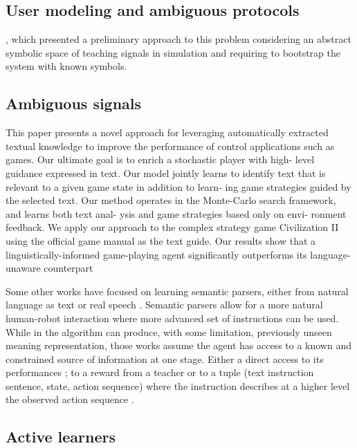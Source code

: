 \subsection{User modeling and ambiguous protocols}

\cite{macl11simul}, which presented a preliminary approach to this problem considering an abstract symbolic space of teaching signals in simulation and requiring to bootstrap the system with known symbols. 

\subsection{Ambiguous signals}

\cite{branavan2011learning} This paper presents a novel approach for leveraging automatically extracted textual knowledge to improve the performance of control applications such as games. Our ultimate goal is to enrich a stochastic player with high- level guidance expressed in text. Our model jointly learns to identify text that is relevant to a given game state in addition to learn- ing game strategies guided by the selected text. Our method operates in the Monte-Carlo search framework, and learns both text anal- ysis and game strategies based only on envi- ronment feedback. We apply our approach to the complex strategy game Civilization II using the official game manual as the text guide. Our results show that a linguistically-informed game-playing agent significantly outperforms its language-unaware counterpart

Some other works have focused on learning semantic parsers, either from natural language as text \cite{branavan2011learning,kim2012unsupervised} or real speech \cite{doshi2008spoken}. Semantic parsers allow for a more natural human-robot interaction where more advanced set of instructions can be used. While in \cite{kim2012unsupervised} the algorithm can produce, with some limitation, previously unseen meaning representation, those works assume the agent has access to a known and constrained source of information at one stage. Either a direct access to its performances \cite{branavan2011learning}; to a reward from a teacher \cite{doshi2008spoken} or to a tuple (text instruction sentence, state, action sequence) where the instruction describes at a higher level the observed action sequence \cite{kim2012unsupervised}.

\subsection{Active learners}

